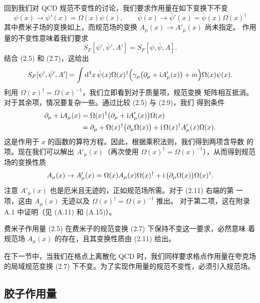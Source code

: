 回到我们对 QCD 规范不变性的讨论，我们要求作用量在如下变换下不变
\begin{equation}
  \psi(x) \to \psi'(x) = \Omega(x)\psi(x) , \qquad
  \bar\psi(x) \to \bar\psi'(x) = \bar\psi(x)\Omega(x)^\dagger
\end{equation}
其中费米子场的变换如上，而规范场的变换 $A_\mu(x) \to A'_\mu(x)$ 尚未指定。
作用量的不变性意味着我们要求
\begin{equation}
  S_F[\psi', \bar\psi', A'] = S_F[\psi, \bar\psi, A] .
\end{equation}
结合 (2.5) 和 (2.7)，这给出
\begin{equation}
  S_F[\psi', \bar\psi', A'] =
    \int \mathrm{d}^4 x\,
    \bar\psi(x)\Omega(x)^\dagger
    \Big(\gamma_\mu \big(\partial_\mu + \mathrm{i} A'_\mu(x)\big) + m\Big)
    \Omega(x)\psi(x) .
\end{equation}
利用 $\Omega(x)^\dagger = \Omega(x)^{-1}$，我们立即看到对于质量项，规范变换
矩阵相互抵消。对于其余项，情况要复杂一些。通过比较 (2.5) 与 (2.9)，我们
得到条件
\begin{equation}
  \begin{split}
    \partial_\mu + \mathrm{i} A_\mu(x) &=
      \Omega(x)^\dagger \big(\partial_\mu + \mathrm{i} A'_\mu(x)\big) \Omega(x) \\
    &= \partial_\mu + \Omega(x)^\dagger \big(\partial_\mu \Omega(x)\big)
      + \mathrm{i}\, \Omega(x)^\dagger A'_\mu(x)\Omega(x) .
  \end{split}
\end{equation}
这是作用于 $x$ 的函数的算符方程。因此，根据乘积法则，我们得到两项含导数
的项。现在我们可以解出 $A'_\mu(x)$（再次使用 $\Omega(x)^\dagger =
\Omega(x)^{-1}$），从而得到规范场的变换性质
\begin{equation}
  A_\mu(x) \to A'_\mu(x)
  = \Omega(x) A_\mu(x) \Omega(x)^\dagger
    + \mathrm{i}\, \big(\partial_\mu \Omega(x)\big) \Omega(x)^\dagger .
\end{equation}
注意 $A'_\mu(x)$ 也是厄米且无迹的，正如规范场所需。对于 (2.11) 右端的第
一项，这由 $A_\mu(x)$ 无迹以及 $\Omega(x)^\dagger = \Omega(x)^{-1}$ 推出。
对于第二项，这在附录 A.1 中证明（见 (A.11) 和 (A.15)）。

费米子作用量 (2.5) 在费米子的规范变换 (2.7) 下保持不变这一要求，必然意味
着规范场 $A_\mu(x)$ 的存在，且其变换性质由 (2.11) 给出。

在下一节中，当我们在格点上离散化 QCD 时，我们同样要求格点作用量在夸克场
的局域规范变换 (2.7) 下不变。为了实现作用量的规范不变性，必须引入规范场。

\subsection{胶子作用量}

